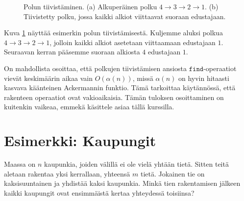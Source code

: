 \begin{figure}
\center
\begin{center}
\end{center}
\caption{Polun tiivistäminen. (a) Alkuperäinen polku $4 \rightarrow 3 \rightarrow 2 \rightarrow 1$.
(b) Tiivistetty polku, jossa kaikki alkiot viittaavat suoraan edustajaan.}
\label{fig:poltii}
\end{figure}

Kuva \ref{fig:poltii} näyttää esimerkin polun tiivistämisestä.
Kuljemme aluksi polkua $4 \rightarrow 3 \rightarrow 2 \rightarrow 1$,
jolloin kaikki alkiot asetetaan viittaamaan edustajaan $1$.
Seuraavan kerran pääsemme suoraan alkiosta $4$ edustajaan $1$.

On mahdollista osoittaa, että polkujen tiivistämisen ansiosta
$\texttt{find}$-ope\-raatiot vievät keskimäärin aikaa vain
$O(\alpha(n))$, missä $\alpha(n)$ on hyvin hitaasti kasvava
käänteinen Ackermannin funktio.
Tämä tarkoittaa käytännössä, että rakenteen operaatiot
ovat vakioaikaisia.
Tämän tuloksen osoittaminen on kuitenkin vaikeaa,
emmekä käsittele asiaa tällä kurssilla.

\section{Esimerkki: Kaupungit}

Maassa on $n$ kaupunkia, joiden välillä ei ole vielä yhtään tietä.
Sitten teitä aletaan rakentaa yksi kerrallaan, yhteensä $m$ tietä.
Jokainen tie on kaksisuuntainen ja yhdistää kaksi kaupunkia.
Minkä tien rakentamisen jälkeen kaikki kaupungit ovat ensimmäistä
kertaa yhteydessä toisiinsa?

